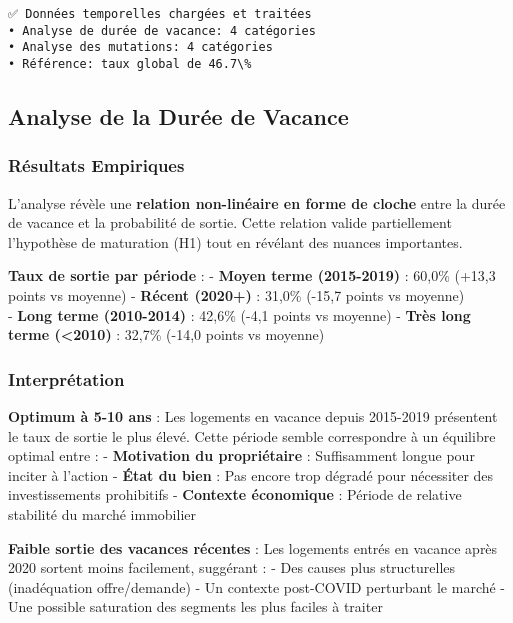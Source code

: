 \documentclass[11pt]{article}
\begin{document}
    \begin{Verbatim}[commandchars=\\\{\}]
✅ Données temporelles chargées et traitées
• Analyse de durée de vacance: 4 catégories
• Analyse des mutations: 4 catégories
• Référence: taux global de 46.7\%
    \end{Verbatim}

    \subsection{Analyse de la Durée de
Vacance}\label{analyse-de-la-duruxe9e-de-vacance}

\subsubsection{Résultats Empiriques}\label{ruxe9sultats-empiriques}

L'analyse révèle une \textbf{relation non-linéaire en forme de cloche}
entre la durée de vacance et la probabilité de sortie. Cette relation
valide partiellement l'hypothèse de maturation (H1) tout en révélant des
nuances importantes.

\textbf{Taux de sortie par période} : - \textbf{Moyen terme (2015-2019)}
: 60,0\% (+13,3 points vs moyenne) - \textbf{Récent (2020+)} : 31,0\%
(-15,7 points vs moyenne)\\
- \textbf{Long terme (2010-2014)} : 42,6\% (-4,1 points vs moyenne) -
\textbf{Très long terme (\textless2010)} : 32,7\% (-14,0 points vs
moyenne)

\subsubsection{Interprétation}\label{interpruxe9tation}

\textbf{Optimum à 5-10 ans} : Les logements en vacance depuis 2015-2019
présentent le taux de sortie le plus élevé. Cette période semble
correspondre à un équilibre optimal entre : - \textbf{Motivation du
propriétaire} : Suffisamment longue pour inciter à l'action -
\textbf{État du bien} : Pas encore trop dégradé pour nécessiter des
investissements prohibitifs - \textbf{Contexte économique} : Période de
relative stabilité du marché immobilier

\textbf{Faible sortie des vacances récentes} : Les logements entrés en
vacance après 2020 sortent moins facilement, suggérant : - Des causes
plus structurelles (inadéquation offre/demande) - Un contexte post-COVID
perturbant le marché - Une possible saturation des segments les plus
faciles à traiter
\end{document}
